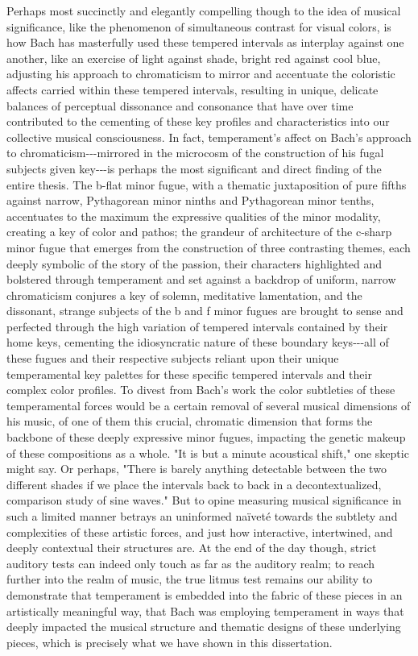 Perhaps most succinctly and elegantly compelling though to the idea of
musical significance, like the phenomenon of simultaneous contrast for
visual colors, is how Bach has masterfully used these tempered intervals
as interplay against one another, like an exercise of light against
shade, bright red against cool blue, adjusting his approach to
chromaticism to mirror and accentuate the coloristic affects carried
within these tempered intervals, resulting in unique, delicate balances
of perceptual dissonance and consonance that have over time contributed
to the cementing of these key profiles and characteristics into our
collective musical consciousness. In fact, temperament's affect on
Bach's approach to chromaticism-\/-\/-mirrored in the microcosm of the
construction of his fugal subjects given key-\/-\/-is perhaps the most
significant and direct finding of the entire thesis. The b-flat minor
fugue, with a thematic juxtaposition of pure fifths against narrow,
Pythagorean minor ninths and Pythagorean minor tenths, accentuates to
the maximum the expressive qualities of the minor modality, creating a
key of color and pathos; the grandeur of architecture of the c-sharp
minor fugue that emerges from the construction of three contrasting
themes, each deeply symbolic of the story of the passion, their
characters highlighted and bolstered through temperament and set against
a backdrop of uniform, narrow chromaticism conjures a key of solemn,
meditative lamentation, and the dissonant, strange subjects of the b and
f minor fugues are brought to sense and perfected through the high
variation of tempered intervals contained by their home keys, cementing
the idiosyncratic nature of these boundary keys-\/-\/-all of these
fugues and their respective subjects reliant upon their unique
temperamental key palettes for these specific tempered intervals and
their complex color profiles. To divest from Bach's work the color
subtleties of these temperamental forces would be a certain removal of
several musical dimensions of his music, of one of them this crucial,
chromatic dimension that forms the backbone of these deeply expressive
minor fugues, impacting the genetic makeup of these compositions as a
whole. "It is but a minute acoustical shift," one skeptic might say. Or
perhaps, "There is barely anything detectable between the two different
shades if we place the intervals back to back in a decontextualized,
comparison study of sine waves." But to opine measuring musical
significance in such a limited manner betrays an uninformed naïveté
towards the subtlety and complexities of these artistic forces, and just
how interactive, intertwined, and deeply contextual their structures
are. At the end of the day though, strict auditory tests can indeed only
touch as far as the auditory realm; to reach further into the realm of
music, the true litmus test remains our ability to demonstrate that
temperament is embedded into the fabric of these pieces in an
artistically meaningful way, that Bach was employing temperament in ways
that deeply impacted the musical structure and thematic designs of these
underlying pieces, which is precisely what we have shown in this
dissertation.

